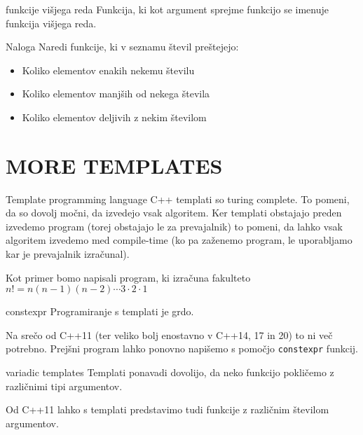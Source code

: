 \documentclass{beamer}
\begin{document}
\begin{frame}{funkcije višjega reda}
  Funkcija, ki kot argument sprejme funkcijo se imenuje funkcija višjega reda.
\end{frame}

\begin{frame}{Naloga}
  Naredi funkcije, ki v seznamu števil preštejejo:
  \begin{itemize}
  \item Koliko elementov enakih nekemu številu
  \item Koliko elementov manjših od nekega števila
  \item Koliko elementov deljivih z nekim številom
  \end{itemize}
\end{frame}

\section{MORE TEMPLATES}
\begin{frame}{Template programming language}
  C++ templati so turing complete. To pomeni, da so dovolj močni, da izvedejo vsak algoritem. Ker templati obstajajo preden izvedemo program (torej obstajajo le za prevajalnik) to pomeni, da lahko vsak algoritem izvedemo med compile-time (ko pa zaženemo program, le uporabljamo kar je prevajalnik izračunal).

  Kot primer bomo napisali program, ki izračuna fakulteto \(n! = n(n-1)(n-2)\cdots3\cdot2\cdot1\)
\end{frame}
\begin{frame}{constexpr}
  Programiranje s templati je grdo.\pause{}
  
  Na srečo od C++11 (ter veliko bolj enostavno v C++14, 17 in 20) to ni več potrebno. Prejšni program lahko ponovno napišemo s pomočjo \texttt{constexpr} funkcij.
\end{frame}

\begin{frame}{variadic templates}
  Templati ponavadi dovolijo, da neko funkcijo pokličemo z različnimi tipi argumentov.

  Od C++11 lahko s templati predstavimo tudi funkcije z različnim številom argumentov.
\end{frame}
\end{document}
